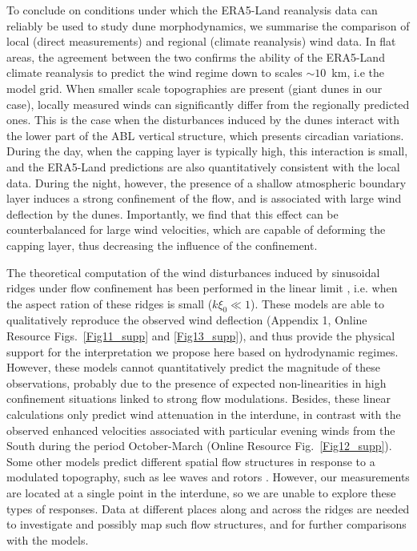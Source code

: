 To conclude on conditions under which the ERA5-Land reanalysis data can reliably be used to study dune morphodynamics, we summarise the comparison of local (direct measurements) and regional (climate reanalysis) wind data. In flat areas, the agreement between the two confirms the ability of the ERA5-Land climate reanalysis to predict the wind regime down to scales $\sim10$~km, i.e the model grid. When smaller scale topographies are present (giant dunes in our case), locally measured winds can significantly differ from the regionally predicted ones. This is the case when the disturbances induced by the dunes interact with the lower part of the ABL vertical structure, which presents circadian variations. During the day, when the capping layer is typically high, this interaction is small, and the ERA5-Land predictions are also quantitatively consistent with the local data. During the night, however, the presence of a shallow atmospheric boundary layer induces a strong confinement of the flow, and is associated with large wind deflection by the dunes. Importantly, we find that this effect can be counterbalanced for large wind velocities, which are capable of deforming the capping layer, thus decreasing the influence of the confinement.

The theoretical computation of the wind disturbances induced by sinusoidal ridges under flow confinement has been performed in the linear limit \citep{Andreotti2009, Andreotti2012}, i.e. when the aspect ration of these ridges is small ($k\xi_0 \ll 1$). These models are able to qualitatively reproduce the observed wind deflection (Appendix 1, Online Resource Figs.~\ref{Fig11_supp} and \ref{Fig13_supp}), and thus provide the physical support for the interpretation we propose here based on hydrodynamic regimes. However, these models cannot quantitatively predict the magnitude of these observations, probably due to the presence of expected non-linearities in high confinement situations linked to strong flow modulations. Besides, these linear calculations only predict wind attenuation in the interdune, in contrast with the observed enhanced velocities associated with particular evening winds from the South during the period October-March (Online Resource Fig.~\ref{Fig12_supp}). Some other models predict different spatial flow structures in response to a modulated topography, such as lee waves and rotors \citep{baines1995, Vosper2004}. However, our measurements are located at a single point in the interdune, so we are unable to explore these types of responses. Data at different places along and across the ridges are needed to investigate and possibly map such flow structures, and for further comparisons with the models.


